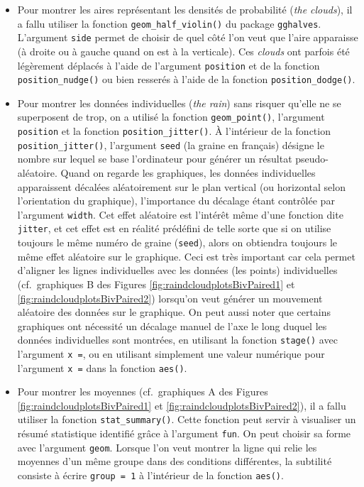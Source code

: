 \documentclass[
  french,
]{book}
\providecommand{\tightlist}{%
  \setlength{\itemsep}{0pt}\setlength{\parskip}{0pt}}
\begin{document}
\begin{itemize}
\tightlist
\item
  Pour montrer les aires représentant les densités de probabilité (\emph{the clouds}), il a fallu utiliser la fonction \texttt{geom\_half\_violin()} du package \texttt{gghalves}. L'argument \texttt{side} permet de choisir de quel côté l'on veut que l'aire apparaisse (à droite ou à gauche quand on est à la verticale). Ces \emph{clouds} ont parfois été légèrement déplacés à l'aide de l'argument \texttt{position} et de la fonction \texttt{position\_nudge()} ou bien resserés à l'aide de la fonction \texttt{position\_dodge()}.
\item
  Pour montrer les données individuelles (\emph{the rain}) sans risquer qu'elle ne se superposent de trop, on a utilisé la fonction \texttt{geom\_point()}, l'argument \texttt{position} et la fonction \texttt{position\_jitter()}. À l'intérieur de la fonction \texttt{position\_jitter()}, l'argument \texttt{seed} (la graine en français) désigne le nombre sur lequel se base l'ordinateur pour générer un résultat pseudo-aléatoire. Quand on regarde les graphiques, les données individuelles apparaissent décalées aléatoirement sur le plan vertical (ou horizontal selon l'orientation du graphique), l'importance du décalage étant contrôlée par l'argument \texttt{width}. Cet effet aléatoire est l'intérêt même d'une fonction dite \texttt{jitter}, et cet effet est en réalité prédéfini de telle sorte que si on utilise toujours le même numéro de graine (\texttt{seed}), alors on obtiendra toujours le même effet aléatoire sur le graphique. Ceci est très important car cela permet d'aligner les lignes individuelles avec les données (les points) individuelles (cf.~graphiques B des Figures \ref{fig:raindcloudplotsBivPaired1} et \ref{fig:raindcloudplotsBivPaired2}) lorsqu'on veut générer un mouvement aléatoire des données sur le graphique. On peut aussi noter que certains graphiques ont nécessité un décalage manuel de l'axe le long duquel les données individuelles sont montrées, en utilisant la fonction \texttt{stage()} avec l'argument \texttt{x\ =}, ou en utilisant simplement une valeur numérique pour l'argument \texttt{x\ =} dans la fonction \texttt{aes()}.
\item
  Pour montrer les moyennes (cf.~graphiques A des Figures \ref{fig:raindcloudplotsBivPaired1} et \ref{fig:raindcloudplotsBivPaired2}), il a fallu utiliser la fonction \texttt{stat\_summary()}. Cette fonction peut servir à visualiser un résumé statistique identifié grâce à l'argument \texttt{fun}. On peut choisir sa forme avec l'argument \texttt{geom}. Lorsque l'on veut montrer la ligne qui relie les moyennes d'un même groupe dans des conditions différentes, la subtilité consiste à écrire \texttt{group\ =\ 1} à l'intérieur de la fonction \texttt{aes()}.

\end{itemize}
\end{document}
